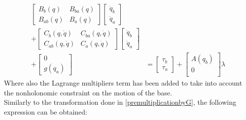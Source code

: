\begin{equation}
\begin{split}
\left[
\begin{matrix}
B_b(q)&B_{ba}(q)\\
B_{ab}(q)&B_a(q)
\end{matrix}\right]\left[
\begin{matrix}
\ddot{q}_b\\\ddot{q}_a
\end{matrix}\right]&\\ +\left[
\begin{matrix}
C_b(q,\dot{q})&C_{ba}(q,\dot{q})\\
C_{ab}(q,\dot{q})&C_a(q,\dot{q})
\end{matrix}\right]\left[
\begin{matrix}
\dot{q}_b\\\dot{q}_a
\end{matrix}\right] &\\ +\left[
\begin{matrix}
0\\g(q_a)
\end{matrix}\right]	&= \left[
\begin{matrix}
\tau_b\\\tau_a
\end{matrix}\right]+\left[
\begin{matrix}
A(q_b)\\0\\
\end{matrix}\right]\lambda
\end{split}	
\end{equation}
Where also the Lagrange multipliers term has been added to take into account the nonholonomic constraint on the motion of the base. \\Similarly to the transformation done in \ref{premultiplicationbyG}, the following expression can be obtained:
